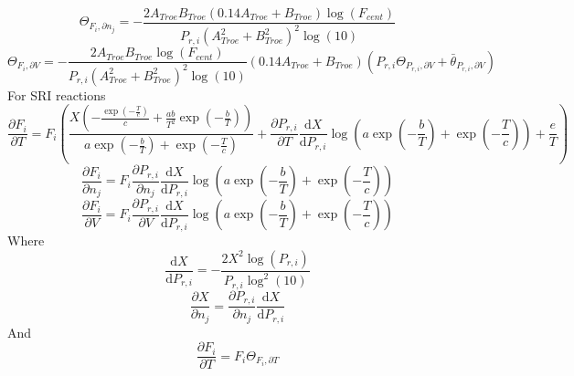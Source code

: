 \documentclass[a4paper,10pt]{article}
\begin{document}
\begin{dmath} \Theta_{F_i, \partial n_j} = - \frac{2 A_{Troe} B_{Troe} \left(0.14 A_{Troe} + B_{Troe}\right) \log{\left (F_{cent} \right )}}{P_{r, i} \left(A_{Troe}^{2} + B_{Troe}^{2}\right)^{2} \log{\left (10 \right )}}\end{dmath} 
\begin{dmath} \Theta_{F_i, \partial V} = - \frac{2 A_{Troe} B_{Troe} \log{\left (F_{cent} \right )}}{P_{r, i} \left(A_{Troe}^{2} + B_{Troe}^{2}\right)^{2} \log{\left (10 \right )}} \left(0.14 A_{Troe} + B_{Troe}\right) \left(P_{r, i} \Theta_{P_{r,i}, \partial V} + \bar{\theta}_{P_{r, i}, \partial V}\right)\end{dmath} 
For SRI reactions
\begin{dmath} \frac{\partial F_{i} }{\partial T } = F_{i} \left(\frac{X \left(- \frac{\operatorname{exp}\left({- \frac{T}{c}}\right)}{c} + \frac{a b}{T^{2}} \operatorname{exp}\left({- \frac{b}{T}}\right)\right)}{a \operatorname{exp}\left({- \frac{b}{T}}\right) + \operatorname{exp}\left({- \frac{T}{c}}\right)} + \frac{\partial P_{r, i} }{\partial T } \frac{\text{d} X }{\text{d} P_{r, i} } \log{\left (a \operatorname{exp}\left({- \frac{b}{T}}\right) + \operatorname{exp}\left({- \frac{T}{c}}\right) \right )} + \frac{e}{T}\right)\end{dmath} 
\begin{dmath} \frac{\partial F_{i} }{\partial {n_j} } = F_{i} \frac{\partial P_{r, i} }{\partial {n_j} } \frac{\text{d} X }{\text{d} P_{r, i} } \log{\left (a \operatorname{exp}\left({- \frac{b}{T}}\right) + \operatorname{exp}\left({- \frac{T}{c}}\right) \right )}\end{dmath} 
\begin{dmath} \frac{\partial F_{i} }{\partial V } = F_{i} \frac{\partial P_{r, i} }{\partial V } \frac{\text{d} X }{\text{d} P_{r, i} } \log{\left (a \operatorname{exp}\left({- \frac{b}{T}}\right) + \operatorname{exp}\left({- \frac{T}{c}}\right) \right )}\end{dmath} 
Where
\begin{dmath} \frac{\text{d} X }{\text{d} P_{r, i} } = - \frac{2 X^{2} \log{\left (P_{r, i} \right )}}{P_{r, i} \log^{2}{\left (10 \right )}}\end{dmath} 
\begin{dmath} \frac{\partial X}{\partial n_j} = \frac{\partial P_{r, i} }{\partial {n_j} } \frac{\text{d} X }{\text{d} P_{r, i} }\end{dmath} 
And
\begin{dmath} \frac{\partial F_{i} }{\partial T } = F_{i} \Theta_{F_i, \partial T}\end{dmath} 
\end{document}

